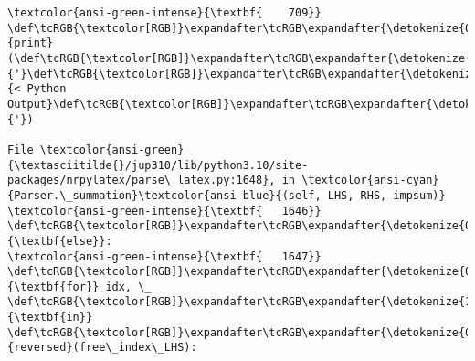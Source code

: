 \documentclass[landscape,letterpaper,10pt,english]{article}
\begin{document}
\begin{Verbatim}[commandchars=\\\{\}, frame=single, framerule=2mm, rulecolor=\color{outerrorbackground}]
\textcolor{ansi-green-intense}{\textbf{    709}}     \def\tcRGB{\textcolor[RGB]}\expandafter\tcRGB\expandafter{\detokenize{0,135,0}}{print}(\def\tcRGB{\textcolor[RGB]}\expandafter\tcRGB\expandafter{\detokenize{175,0,0}}{'}\def\tcRGB{\textcolor[RGB]}\expandafter\tcRGB\expandafter{\detokenize{175,0,0}}{< Python Output}\def\tcRGB{\textcolor[RGB]}\expandafter\tcRGB\expandafter{\detokenize{175,0,0}}{'})

File \textcolor{ansi-green}{\textasciitilde{}/jup310/lib/python3.10/site-packages/nrpylatex/parse\_latex.py:1648}, in \textcolor{ansi-cyan}{Parser.\_summation}\textcolor{ansi-blue}{(self, LHS, RHS, impsum)}
\textcolor{ansi-green-intense}{\textbf{   1646}} \def\tcRGB{\textcolor[RGB]}\expandafter\tcRGB\expandafter{\detokenize{0,135,0}}{\textbf{else}}:
\textcolor{ansi-green-intense}{\textbf{   1647}}     \def\tcRGB{\textcolor[RGB]}\expandafter\tcRGB\expandafter{\detokenize{0,135,0}}{\textbf{for}} idx, \_ \def\tcRGB{\textcolor[RGB]}\expandafter\tcRGB\expandafter{\detokenize{175,0,255}}{\textbf{in}} \def\tcRGB{\textcolor[RGB]}\expandafter\tcRGB\expandafter{\detokenize{0,135,0}}{reversed}(free\_index\_LHS):

\end{Verbatim}
\end{document}

